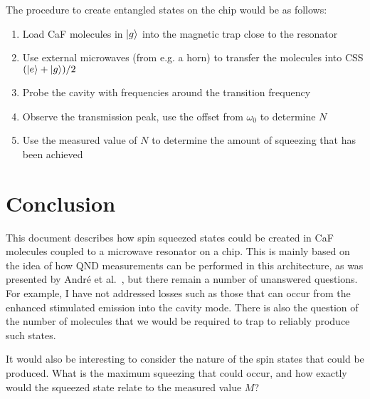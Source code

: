 \documentclass{article}
\begin{document}
The procedure to create entangled states on the chip would be as follows:

\begin{enumerate}
  \item Load CaF molecules in $\ket{g}$ into the magnetic trap close to the
    resonator
  \item Use external microwaves (from e.g. a horn) to transfer the molecules
    into CSS $(\ket{e} + \ket{g})/2$
  \item Probe the cavity with frequencies around the transition frequency
  \item Observe the transmission peak, use the offset from $\omega_0$ to
    determine $N$
  \item Use the measured value of $N$ to determine the amount of squeezing that
    has been achieved
\end{enumerate}

\section{Conclusion}

This document describes how spin squeezed states could be created in CaF
molecules coupled to a microwave resonator on a chip. This is mainly based on
the idea of how QND measurements can be performed in this architecture, as was
presented by Andr\'e et al.~\cite{Andre2006}, but there remain a number of
unanswered questions. For example, I have not addressed losses such as those
that can occur from the enhanced stimulated emission into the cavity mode.
There is also the question of the number of molecules that we would be required
to trap to reliably produce such states.

It would also be interesting to consider the nature of the spin states that
could be produced. What is the maximum squeezing that could occur, and how
exactly would the squeezed state relate to the measured value $M$?

%
%

\printbibliography
\end{document}
